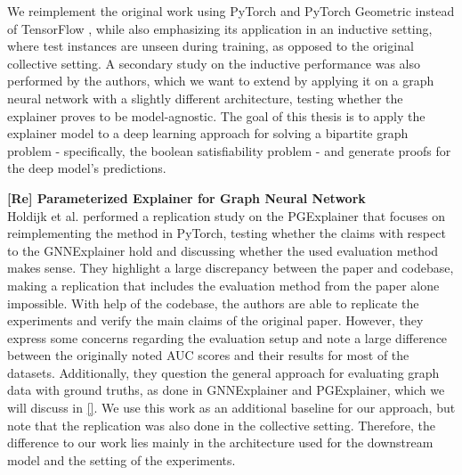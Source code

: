 We reimplement the original work using PyTorch \cite{paszke2019pytorch} and PyTorch Geometric \cite{Fey/Lenssen/2019} instead of TensorFlow \cite{tensorflow2015-whitepaper}, while also emphasizing its application in an inductive setting, where test instances are unseen during training, as opposed to the original collective setting. A secondary study on the inductive performance was also performed by the authors, which we want to extend by applying it on a graph neural network with a slightly different architecture, testing whether the explainer proves to be model-agnostic. The goal of this thesis is to apply the explainer model to a deep learning approach for solving a bipartite graph problem - specifically, the boolean satisfiability problem - and generate proofs for the deep model's predictions. \bigskip


\textbf{[Re] Parameterized Explainer for Graph Neural Network} \\
Holdijk et al. \cite{holdijk2021re} performed a replication study on the PGExplainer that focuses on reimplementing the method in PyTorch, testing whether the claims with respect to the GNNExplainer hold and discussing whether the used evaluation method makes sense. They highlight a large discrepancy between the paper and codebase, making a replication that includes the evaluation method from the paper alone impossible. With help of the codebase, the authors are able to replicate the experiments and verify the main claims of the original paper. However, they express some concerns regarding the evaluation setup and note a large difference between the originally noted AUC scores and their results for most of the datasets. Additionally, they question the general approach for evaluating graph data with ground truths, as done in GNNExplainer and PGExplainer, which we will discuss in \ref{}. We use this work as an additional baseline for our approach, but note that the replication was also done in the collective setting. Therefore, the difference to our work lies mainly in the architecture used for the downstream model and the setting of the experiments.


